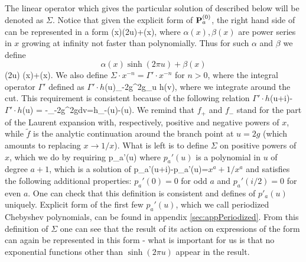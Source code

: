 The linear operator which gives the particular solution of  described below will be denoted as $\Sigma$.
Notice that given the explicit form  of ${\bf P}^{(0)}_a$, the right hand side of  can be represented in a form
\beq
\alpha(x)\sinh(2\pi u)+\beta(x),
\label{alphabetasinh}
\eeq
where $\alpha(x),\beta(x)$ are power series in $x$ growing at infinity not faster than polynomially. 
Thus for such $\alpha$ and $\beta$ we define
\beq
\Sigma\cdot\[\alpha(x)\sinh(2\pi u)+\beta(x)\]\equiv \sinh(2\pi u) \Sigma\cdot \alpha(x)+\Sigma\cdot \beta(x).
\eeq
We also define $\Sigma\cdot x^{-n}=\Gamma'\cdot x^{-n}$ for $n>0$, where the integral operator $\Gamma'$ defined as
\beq
\(\Gamma'\cdot h\)(u)\equiv \oint_{-2g}^{2g}\partial_u \log \frac{\Gamma[i (u-v)+1]}{\Gamma[-i (u-v)]}h(v),
\label{Gammaprime}
\eeq
where we integrate around the cut. 
This requirement is consistent because of the following relation
\beq
\(\Gamma'\cdot h\)(u+i)-\(\Gamma'\cdot h\)(u)
=
-\oint_{-2g}^{2g}dv=h_-(u)-(u).
\label{eq:Gammaproperty}
\eeq
We remind that $f_+$ and $f_-$ stand for the part of the Laurent expansion with, respectively, positive and negative powers of $x$, while $\tilde f$ is the analytic continuation around the branch point at $u=2g$ (which amounts to replacing $x\to 1/x$).
What is left is to define $\Sigma$ on positive powers of $x$, which we do by requiring
\beq
\Sigma\cdot\left[x^a+1/x^a\right] p_a'(u) %
\label{paprime}
\eeq
where $p_a'(u)$ is a polynomial in $u$ of degree $a+1$, which is a solution of
\beq
p_a'(u+i)-p_a'(u)=\(x^a+1/x^a\)
\eeq
and satisfies the following additional properties: $p_a'(0)=0$ for odd $a$  and $p_a'(i/2)=0$ for even $a$. 
One can check that this definition is consistent and defines of $p'_a(u)$ uniquely. 
Explicit form of the first few $p_a'(u)$, which we call periodized  Chebyshev polynomials, can be found in appendix \ref{sec:appPeriodized}.
From this definition of $\Sigma$ one can see that the result of its action on expressions of the form  can again be represented in this form - what is important for us is that no exponential functions other than $\sinh(2\pi u)$ appear in the result.

